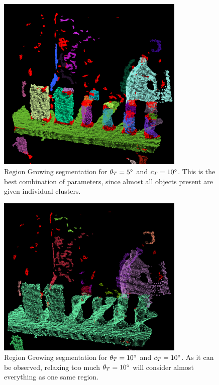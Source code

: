 \documentclass[../main.tex]{subfiles}
\begin{document}
\begin{figure}[htbp]
    \centering
    \includegraphics[width=0.8\textwidth]{images/region_growing_testbench_st5.png}
    \caption{Region Growing segmentation for $\theta_{T}=5\degree$ and $c_{T}=10\degree$. This is the best combination of parameters, since almost all objects present are given individual clusters.}
    \label{fig:region_growing_testbench_st5}
\end{figure}

\begin{figure}[htbp]
    \centering
    \includegraphics[width=0.8\textwidth]{images/region_growing_testbench_st10.png}
    \caption{Region Growing segmentation for $\theta_{T}=10\degree$ and $c_{T}=10\degree$. As it can be observed, relaxing too much $\theta_{T}=10\degree$ will consider almost everything as one same region.}
    \label{fig:region_growing_testbench_st10}
\end{figure}
\end{document}
